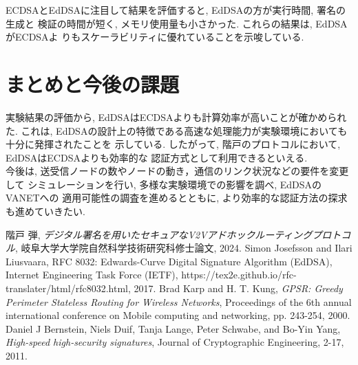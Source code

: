 \documentclass[a4j,9pt,twocolumn]{jsarticle}
\begin{document}
\vspace{-3mm}
  
\indent ECDSAとEdDSAに注目して結果を評価すると, EdDSAの方が実行時間, 署名の生成と
検証の時間が短く, メモリ使用量も小さかった. これらの結果は, EdDSAがECDSAよ
りもスケーラビリティに優れていることを示唆している. 

\section{まとめと今後の課題}
\indent 実験結果の評価から, EdDSAはECDSAよりも計算効率が高いことが確かめられた. 
これは, EdDSAの設計上の特徴である高速な処理能力が実験環境においても十分に発揮されたことを
示している. したがって, 階戸のプロトコルにおいて, EdDSAはECDSAよりも効率的な
認証方式として利用できるといえる. \\
\indent 今後は, 送受信ノードの数やノードの動き，通信のリンク状況などの要件を変更して
シミュレーションを行い, 多様な実験環境での影響を調べ, EdDSAのVANETへの
適用可能性の調査を進めるとともに, より効率的な認証方法の探求も進めていきたい. 




\noindent\hrulefill %
\begin{thebibliography}{99}
     階戸 弾,
        \textit{デジタル署名を用いたセキュアなV2Vアドホックルーティングプロトコル},
            岐阜大学大学院自然科学技術研究科修士論文, 2024.
     Simon Josefsson and Ilari Liusvaara, 
        RFC 8032: Edwards-Curve Digital Signature Algorithm (EdDSA),
        Internet Engineering Task Force (IETF), 
        https://tex2e.github.io/rfc-translater/html/rfc8032.html, 
        2017.
     Brad Karp and H. T. Kung, 
        \textit{GPSR: Greedy Perimeter Stateless Routing for Wireless Networks},
        Proceedings of the 6th annual international conference on Mobile computing and networking,
        pp. 243-254, 
        2000.
     Daniel J Bernstein, Niels Duif, Tanja Lange, Peter Schwabe, and Bo-Yin Yang,
        \textit{High-speed high-security signatures}, Journal of Cryptographic Engineering,
        2-17, 2011.
\end{thebibliography}

\end{document}

